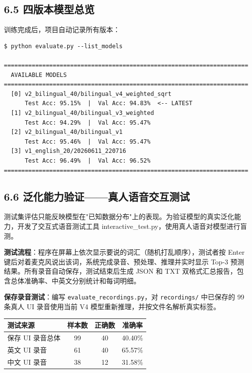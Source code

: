 ﻿\documentclass[12pt,a4paper]{article}
\begin{document}
\subsection*{6.5 四版本模型总览}

训练完成后，项目自动记录所有版本：

\begin{verbatim}
$ python evaluate.py --list_models

======================================================================
  AVAILABLE MODELS
======================================================================
  [0] v2_bilingual_40/bilingual_v4_weighted_sqrt
      Test Acc: 95.15%  |  Val Acc: 94.83%  <-- LATEST
  [1] v2_bilingual_40/bilingual_v3_weighted
      Test Acc: 94.29%  |  Val Acc: 95.47%
  [2] v2_bilingual_40/bilingual_v1
      Test Acc: 95.46%  |  Val Acc: 95.47%
  [3] v1_english_20/20260611_220716
      Test Acc: 96.49%  |  Val Acc: 96.52%
======================================================================
\end{verbatim}

\subsection*{6.6 泛化能力验证——真人语音交互测试}

测试集评估只能反映模型在"已知数据分布"上的表现。为验证模型的真实泛化能力，开发了交互式语音测试工具 interactive\_test.py，使用真人语音对模型进行盲测。

\textbf{测试流程}：程序在屏幕上依次显示要说的词汇（随机打乱顺序），测试者按 Enter 键后对着麦克风说出该词，系统完成录音、预处理、推理并实时显示 Top-3 预测结果。所有录音自动保存，测试结束后生成 JSON 和 TXT 双格式汇总报告，包含总体准确率、中英文分别统计和每词明细。


\textbf{保存录音测试}：编写 \texttt{evaluate\_recordings.py}，对 \texttt{recordings/} 中已保存的 99 条真人 UI 录音使用当前 V4 模型重新推理，并按文件名解析真实标签。
\begin{center}
\begin{tabular}{lccc}\toprule
\textbf{测试来源} & \textbf{样本数} & \textbf{正确数} & \textbf{准确率}\\\midrule
保存 UI 录音总体 & 99 & 40 & 40.40\%\\
英文 UI 录音 & 61 & 40 & 65.57\%\\
中文 UI 录音 & 38 & 12 & 31.58\%\\\bottomrule
\end{tabular}
\end{center}
\end{document}
